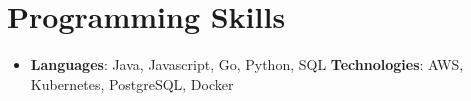 \documentclass[letterpaper,11pt]{article}
\newcommand{\resumeSubHeadingListStart}{\begin{itemize}[leftmargin=*]}
\newcommand{\resumeSubHeadingListEnd}{\end{itemize}}
\begin{document}
    \section{Programming Skills}
     \resumeSubHeadingListStart
       \item{
         \textbf{Languages}{: Java, Javascript, Go, Python, SQL}
         \hfill
         \textbf{Technologies}{: AWS, Kubernetes, PostgreSQL, Docker}
       }
     \resumeSubHeadingListEnd
    
\end{document}
